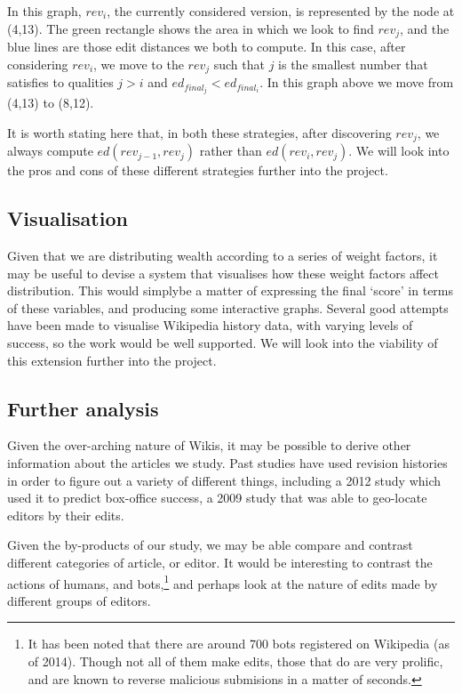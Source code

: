 In this graph, $rev_i$, the currently considered version, is
represented by the node at (4,13). The green rectangle shows
the area in which we look to find $rev_j$, and the blue lines
are those edit distances we both to compute. In this case,
after considering $rev_i$, we move to the $rev_j$ such that $j$ is
the smallest number that satisfies to qualities $j > i$ and
$ed_{final_j} < ed_{final_i}$. In this graph above we move
from (4,13) to (8,12).

It is worth stating here that, in both these strategies, after
discovering $rev_j$, we always compute $ed(rev_{j-1}, rev_j)$ rather than
$ed(rev_i,rev_j)$. We will look into the pros and cons of these different
strategies further into the project.

\subsection*{Visualisation}
Given that we are distributing wealth according to a series of weight
factors, it may be useful to devise a system that visualises how these
weight factors affect distribution. This would simplybe a matter of
expressing the final `score' in terms of these variables, and
producing some interactive graphs. Several good attempts have been
made to visualise Wikipedia history data, with varying levels of
success,\cite{Chi2008}\cite{Sabel2007}\cite{Suh2007}\cite{Wu2013}\cite{Viegas2004}
so the work would be well supported. We will look into the viability
of this extension further into the project.

\subsection*{Further analysis}
Given the over-arching nature of Wikis, it may be possible to derive
other information about the articles we study. Past studies have used
revision histories in order to figure out a variety of different
things, including a 2012 study which used it to predict box-office
success,\cite{Mestyan2012} a 2009 study that was able to geo-locate
editors by their edits.\cite{Lieberman2009}

Given the by-products of our study, we may be able compare and
contrast different categories of article, or editor. It would be
interesting to contrast the actions of humans, and bots,\footnote{It
  has been noted that there are around 700 bots registered on
  Wikipedia (as of 2014). Though not all of them make edits, those
  that do are very prolific, and are known to reverse malicious
  submisions in a matter of seconds.\cite{wiki-bots}\cite{bbc-bots}}
and perhaps look at the nature of edits made by different groups of
editors.

